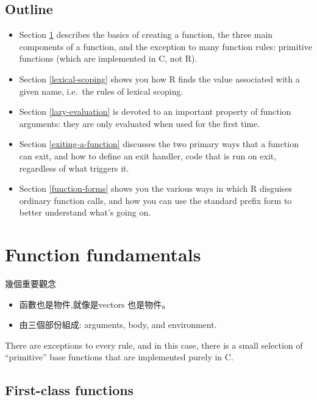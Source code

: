 \documentclass[]{book}
\theoremstyle{definition}
\theoremstyle{definition}
\theoremstyle{definition}
\theoremstyle{remark}
\begin{document}
\subsection*{Outline}\label{outline}

\begin{itemize}
\item
  Section \ref{function-fundamentals} describes the basics of creating a
  function, the three main components of a function, and the exception
  to many function rules: primitive functions (which are implemented in
  C, not R).
\item
  Section \ref{lexical-scoping} shows you how R finds the value
  associated with a given name, i.e.~the rules of lexical scoping.
\item
  Section \ref{lazy-evaluation} is devoted to an important property of
  function arguments: they are only evaluated when used for the first
  time.
\item
  Section \ref{exiting-a-function} discusses the two primary ways that a
  function can exit, and how to define an exit handler, code that is run
  on exit, regardless of what triggers it.
\item
  Section \ref{function-forms} shows you the various ways in which R
  disguises ordinary function calls, and how you can use the standard
  prefix form to better understand what's going on.
\end{itemize}

\section{Function fundamentals}\label{function-fundamentals}

幾個重要觀念

\begin{itemize}
\item
  函數也是物件,就像是vectors 也是物件。
\item
  由三個部份組成: arguments, body, and environment.
\end{itemize}

There are exceptions to every rule, and in this case, there is a small
selection of ``primitive'' base functions that are implemented purely in
C.

\subsection{First-class functions}\label{first-class-functions}
\end{document}
